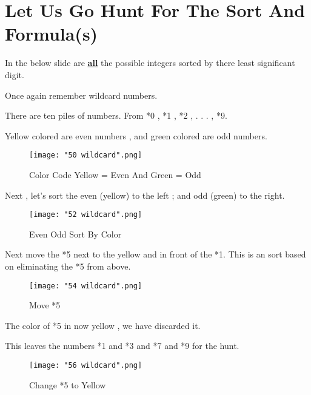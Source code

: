 \documentclass[12pt,letterpaper,oneside,titlepage]{article}
\begin{document}
\pagebreak 
\section{Let Us Go Hunt For The Sort And Formula(s)}
\par 
\tab In the below slide are \underline{\textbf{all}} the possible integers sorted by there least significant digit. 
\\
\par
Once again remember wild\textendash card numbers.
\\
\par 
There are ten piles of numbers.  From *0 , *1 , *2 ,  . . . , *9.
\\
\par
Yellow colored are even numbers , and green colored are odd numbers.
\\
\begin{figure}[h]
	\centering
	\texttt{[image: "50 wildcard".png]}
	\caption{Color Code Yellow = Even And Green = Odd }
\end{figure}

\pagebreak  


\par 
Next , let's sort the even (yellow) to the left ; and odd (green) to the right.
\begin{figure}[h]
	\centering
	\texttt{[image: "52 wildcard".png]}
	\caption{Even Odd Sort By Color}
\end{figure}

\pagebreak

\par 
Next move the *5 next to the yellow and in front of the *1. This is an sort based on eliminating the *5 from above.
\begin{figure}[h]
\centering
\texttt{[image: "54 wildcard".png]}
\caption{Move *5}
\end{figure}
\pagebreak

\par 
The color of *5 in now yellow , we have discarded it.
\par
This leaves the numbers *1 and *3 and *7 and *9 for the hunt.
\begin{figure}[h]
\centering
\texttt{[image: "56 wildcard".png]}
\caption{Change *5 to Yellow}
\end{figure}
\pagebreak
\end{document}
